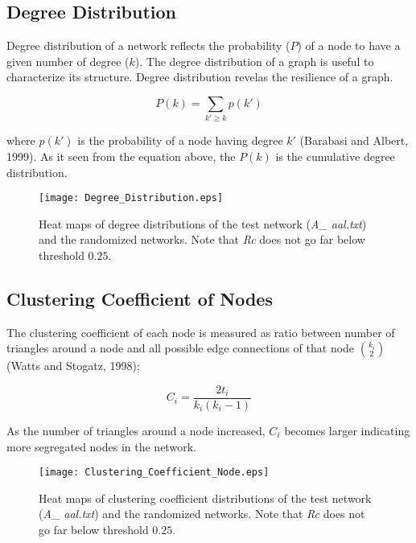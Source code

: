 \documentclass[12pt]{article}
\begin{document}
\subsection{Degree Distribution}
Degree distribution of a network reflects the probability ($P$) of a node to have a given number of degree ($k$). The degree distribution of a graph is useful to characterize its structure. Degree distribution revelas the resilience of a graph. 

\begin{equation}
 P(k) = \sum\limits_{k' \geq k} p(k')
\end{equation}

where $p(k')$ is the probability of a node having degree $k'$ (Barabasi and Albert, 1999). As it seen from the equation above, the $P(k)$ is the 
cumulative degree distribution. 

\begin{figure}[h!]
	\centering
	\texttt{[image: Degree\_Distribution.eps]}
	\caption{Heat maps of degree distributions of the test network (\textit{A\_ aal.txt}) and the randomized networks. Note that \textit{Rc} does not go far below threshold $0.25$.}
\end{figure}

\newpage

\subsection{Clustering Coefficient of Nodes}

The clustering coefficient of each node is measured as ratio between number of triangles around a node and all possible edge connections of that node ${k_i \choose 2} $ (Watts and Stogatz, 1998); 

\begin{equation}
C_i =  \frac{2t_i}{k_i(k_i -1)}
\end{equation}

As the number of triangles around a node increased, $C_i$ becomes larger indicating more segregated nodes in the network.

\begin{figure}[h!]
	\centering
	\texttt{[image: Clustering\_Coefficient\_Node.eps]}
	\caption{Heat maps of clustering coefficient distributions of the test network (\textit{A\_ aal.txt}) and the randomized networks. Note that \textit{Rc} does not go far below threshold $0.25$.}
\end{figure}
\end{document}
